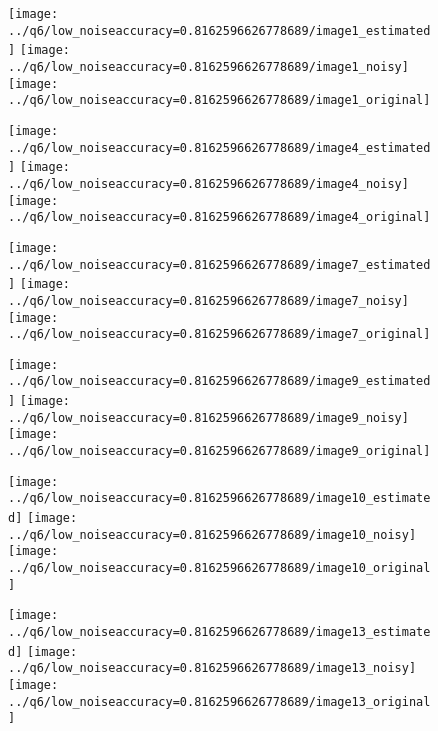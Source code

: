 \documentclass[a4paper,12pt]{article}
\begin{document}
\begin{figure}[!htb]
  \texttt{[image: ../q6/low\_noiseaccuracy=0.8162596626778689/image1\_estimated]}
\endminipage\hfill
{}
  \texttt{[image: ../q6/low\_noiseaccuracy=0.8162596626778689/image1\_noisy]}
\endminipage\hfill
{}
  \texttt{[image: ../q6/low\_noiseaccuracy=0.8162596626778689/image1\_original]}
\endminipage\hfill

  \texttt{[image: ../q6/low\_noiseaccuracy=0.8162596626778689/image4\_estimated]}
\endminipage\hfill
{}
  \texttt{[image: ../q6/low\_noiseaccuracy=0.8162596626778689/image4\_noisy]}
\endminipage\hfill
{}
  \texttt{[image: ../q6/low\_noiseaccuracy=0.8162596626778689/image4\_original]}
\endminipage\hfill

  \texttt{[image: ../q6/low\_noiseaccuracy=0.8162596626778689/image7\_estimated]}
\endminipage\hfill
{}
  \texttt{[image: ../q6/low\_noiseaccuracy=0.8162596626778689/image7\_noisy]}
\endminipage\hfill
{}
  \texttt{[image: ../q6/low\_noiseaccuracy=0.8162596626778689/image7\_original]}
\endminipage\hfill

  \texttt{[image: ../q6/low\_noiseaccuracy=0.8162596626778689/image9\_estimated]}
\endminipage\hfill
{}
  \texttt{[image: ../q6/low\_noiseaccuracy=0.8162596626778689/image9\_noisy]}
\endminipage\hfill
{}
  \texttt{[image: ../q6/low\_noiseaccuracy=0.8162596626778689/image9\_original]}
\endminipage\hfill

  \texttt{[image: ../q6/low\_noiseaccuracy=0.8162596626778689/image10\_estimated]}
\endminipage\hfill
{}
  \texttt{[image: ../q6/low\_noiseaccuracy=0.8162596626778689/image10\_noisy]}
\endminipage\hfill
{}
  \texttt{[image: ../q6/low\_noiseaccuracy=0.8162596626778689/image10\_original]}
\endminipage\hfill

  \texttt{[image: ../q6/low\_noiseaccuracy=0.8162596626778689/image13\_estimated]}
\endminipage\hfill
{}
  \texttt{[image: ../q6/low\_noiseaccuracy=0.8162596626778689/image13\_noisy]}
\endminipage\hfill
{}
  \texttt{[image: ../q6/low\_noiseaccuracy=0.8162596626778689/image13\_original]}
\endminipage\hfill


\end{figure}
\end{document}
